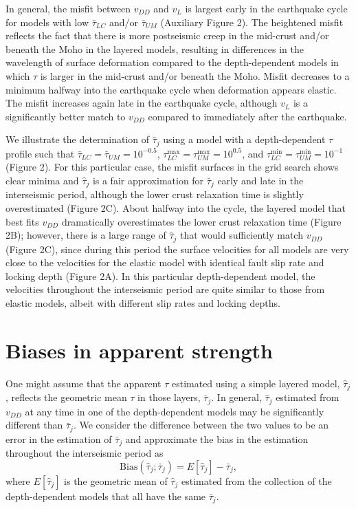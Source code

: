 In general, the misfit between $v_{DD}$ and $v_{L}$ is largest early
in the earthquake cycle for models with low $\bar{\tau}_{LC}$ and/or
$\bar{\tau}_{UM}$ (Auxiliary Figure 2). The heightened misfit reflects
the fact that there is more postseismic creep in the mid-crust and/or
beneath the Moho in the layered models, resulting in differences in
the wavelength of surface deformation compared to the depth-dependent
models in which $\tau$ is larger in the mid-crust and/or beneath the
Moho.  Misfit decreases to a minimum halfway into the earthquake cycle
when deformation appears elastic.  The misfit increases again late in
the earthquake cycle, although $v_{L}$ is a significantly better match
to $v_{DD}$ compared to immediately after the earthquake.

We illustrate the determination of $\hat{\tau}_j$ using a model with a
depth-dependent $\tau$ profile such that $\bar{\tau}_{LC} =
\bar{\tau}_{UM} = 10^{-0.5}$, $\tau_{LC}^{\max} = \tau_{UM}^{\max} =
10^{0.5}$, and $\tau_{LC}^{\min} = \tau_{UM}^{\min} = 10^{-1}$ (Figure
2). For this particular case, the misfit surfaces in the grid search
shows clear minima and $\hat{\tau}_j$ is a fair approximation for
$\bar{\tau}_j$ early and late in the interseismic period, although the
lower crust relaxation time is slightly overestimated (Figure 2C).
About halfway into the cycle, the layered model that best fits
$v_{DD}$ dramatically overestimates the lower crust relaxation time
(Figure 2B); however, there is a large range of $\hat{\tau}_j$ that
would sufficiently match $v_{DD}$ (Figure 2C), since during this
period the surface velocities for all models are very close to the
velocities for the elastic model with identical fault slip rate and
locking depth (Figure 2A). In this particular depth-dependent model,
the velocities throughout the interseismic period are quite similar to
those from elastic models, albeit with different slip rates and
locking depths.

\section{Biases in apparent strength}
One might assume that the apparent $\tau$ estimated using a simple
layered model, $\hat{\tau}_j$, reflects the geometric mean $\tau$ in
those layers, $\bar{\tau}_j$. In general, $\hat{\tau}_j$ estimated
from $v_{DD}$ at any time in one of the depth-dependent models may be
significantly different than $\bar{\tau}_j$.  We consider the
difference between the two values to be an error in the estimation of
$\bar{\tau}_j$ and approximate the bias in the estimation throughout
the interseismic period as
\begin{equation}
\mathrm{Bias}(\hat{\tau}_j; \bar{\tau}_j) = E[\hat{\tau}_j] - \bar{\tau}_j,
\label{bias}
\end{equation}
where $E[\hat{\tau}_j]$ is the geometric mean of $\hat{\tau}_j$
estimated from the collection of the depth-dependent models that all
have the same $\bar{\tau}_j$.

